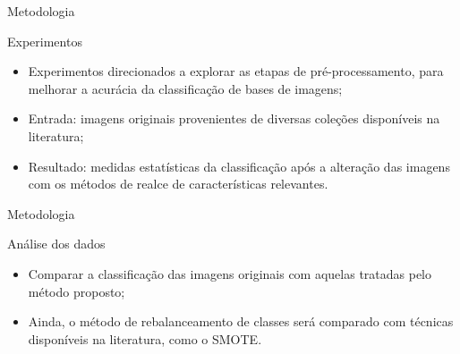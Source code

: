 \documentclass{beamer}
\begin{document}
\begin{frame}{Metodologia}
\begin{block}{Experimentos}
\justifying
\begin{itemize}
\item Experimentos direcionados a explorar as etapas de pré-processamento, para melhorar a acurácia da classificação de bases de imagens;
\item Entrada: imagens originais provenientes de diversas coleções disponíveis na literatura;
\item Resultado: medidas estatísticas da classificação após a alteração das imagens com os métodos de realce de características relevantes.
\end{itemize}
\end{block}
\end{frame}
\begin{frame}{Metodologia}
\begin{block}{Análise dos dados}
\justifying
\begin{itemize}
\item Comparar a classificação das imagens originais com aquelas tratadas pelo método proposto;
\item Ainda, o método de rebalanceamento de classes será comparado com técnicas disponíveis na literatura, como o SMOTE.
\end{itemize}
\end{block}
\end{frame}
\end{document}
